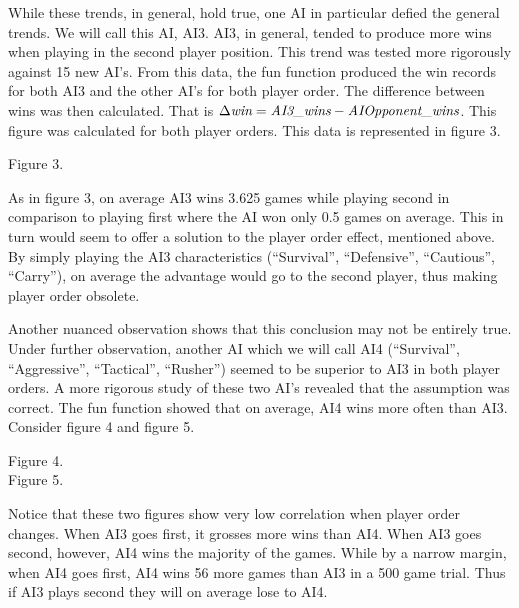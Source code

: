 \documentclass[12pt]{article}  %
\begin{document}
While these trends, in general, hold true, one AI in particular defied the general trends. We will call this AI, AI3. AI3, in general, tended to produce more wins when playing in the second player position. This trend was tested more rigorously against 15 new AI’s. From this data, the fun function produced the win records for both AI3 and the other AI’s for both player order. The difference between wins was then calculated. That is $\Delta \emph{win} = \emph{AI3\_wins} - \emph{AIOpponent\_wins}$. This figure was calculated for both player orders. This data is represented in figure 3.



\begin{center}
{\footnotesize Figure 3.}
\end{center}


As in figure 3, on average AI3 wins 3.625 games while playing second in comparison to playing first where the AI won only 0.5 games on average. This in turn would seem to offer a solution to the player order effect, mentioned above. By simply playing the AI3 characteristics (“Survival”, “Defensive”, “Cautious”, “Carry”), on average the advantage would go to the second player, thus making player order obsolete. 


Another nuanced observation shows that this conclusion may not be entirely true. Under further observation, another AI which we will call AI4 (“Survival”, “Aggressive”, “Tactical”, “Rusher”) seemed to be superior to AI3 in both player orders. A more rigorous study of these two AI’s revealed that the assumption was correct. The fun function showed that on average, AI4 wins more often than AI3. Consider figure 4 and figure 5. 



\begin{center}
{\footnotesize Figure 4.}\\
{\footnotesize Figure 5.}
\end{center}

Notice that these two figures show very low correlation when player order changes. When AI3 goes first, it grosses more wins than AI4. When AI3 goes second, however, AI4 wins the majority of the games. While by a narrow margin, when AI4 goes first, AI4 wins 56 more games than AI3 in a 500 game trial. Thus if AI3 plays second they will on average lose to AI4. 
\end{document}
